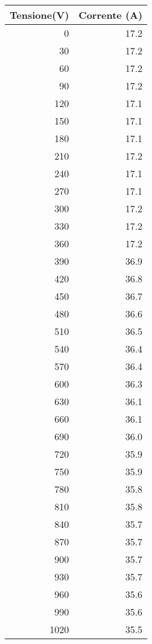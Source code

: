 \documentclass[10pt,twocolumn]{article}
\begin{document}
\begin{table}[H]
    \begin{minipage}{0.5\textwidth}

\centering
\caption*{}
\label{tab:temp2}
\begin{tabular}{|r|r|}
\hline
Tensione(V) & Corrente (A) \\ \hline
0 & 17.2 \\ \hline
30 & 17.2 \\ \hline
60 & 17.2 \\ \hline
90 & 17.2 \\ \hline
120 & 17.1 \\ \hline
150 & 17.1 \\ \hline
180 & 17.1 \\ \hline
210 & 17.2 \\ \hline
240 & 17.1 \\ \hline
270 & 17.1 \\ \hline
300 & 17.2 \\ \hline
330 & 17.2 \\ \hline
360 & 17.2 \\ \hline
390 & 36.9 \\ \hline
420 & 36.8 \\ \hline
450 & 36.7 \\ \hline
480 & 36.6 \\ \hline
510 & 36.5 \\ \hline
540 & 36.4 \\ \hline
570 & 36.4 \\ \hline
600 & 36.3 \\ \hline
630 & 36.1 \\ \hline
660 & 36.1 \\ \hline
690 & 36.0 \\ \hline
720 & 35.9 \\ \hline
750 & 35.9 \\ \hline
780 & 35.8 \\ \hline
810 & 35.8 \\ \hline
840 & 35.7 \\ \hline
870 & 35.7 \\ \hline
900 & 35.7 \\ \hline
930 & 35.7 \\ \hline
960 & 35.6 \\ \hline
990 & 35.6 \\ \hline
1020 & 35.5 \\ \hline
    \end{tabular}
    \end{minipage}
\hfill
\begin{minipage}{0.5\textwidth}



\end{minipage}
\end{table}
\end{document}
